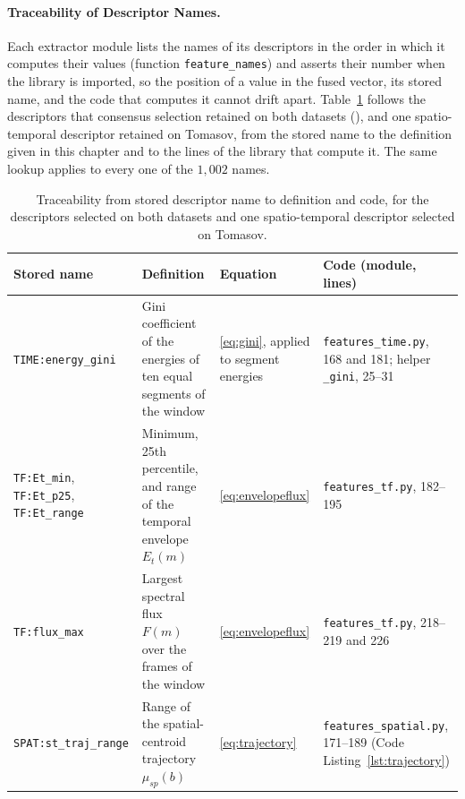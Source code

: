 \paragraph[Traceability of Descriptor Names]{Traceability of Descriptor Names.}
Each extractor module lists the names of its descriptors in the order in which it computes their values (function \texttt{feature\_names}) and asserts their number when the library is imported, so the position of a value in the fused vector, its stored name, and the code that computes it cannot drift apart. Table~\ref{tab:traceability} follows the descriptors that consensus selection retained on both datasets (), and one spatio-temporal descriptor retained on Tomasov, from the stored name to the definition given in this chapter and to the lines of the library that compute it. The same lookup applies to every one of the $1{,}002$ names.

\begin{table}[!htbp]
	\centering
	\caption{Traceability from stored descriptor name to definition and code, for the descriptors selected on both datasets and one spatio-temporal descriptor selected on Tomasov.}
	\label{tab:traceability}
	\footnotesize
	\setlength{\tabcolsep}{4pt}
	\renewcommand{\arraystretch}{1.2}
	\begin{tabularx}{\textwidth}{@{}>{\raggedright\arraybackslash}p{3.7cm} >{\raggedright\arraybackslash}X >{\raggedright\arraybackslash}p{2.0cm} >{\raggedright\arraybackslash}p{4.1cm}@{}}
		\toprule
		\textbf{Stored name} & \textbf{Definition} & \textbf{Equation} & \textbf{Code (module, lines)}\\
		\midrule
		\texttt{TIME:energy\_gini} & Gini coefficient of the energies of ten equal segments of the window & \eqref{eq:gini}, applied to segment energies & \texttt{features\_time.py}, 168 and 181; helper \texttt{\_gini}, 25--31\\
		\addlinespace[3pt]
		\texttt{TF:Et\_min}, \texttt{TF:Et\_p25}, \texttt{TF:Et\_range} & Minimum, 25th percentile, and range of the temporal envelope $E_t(m)$ & \eqref{eq:envelopeflux} & \texttt{features\_tf.py}, 182--195\\
		\addlinespace[3pt]
		\texttt{TF:flux\_max} & Largest spectral flux $F(m)$ over the frames of the window & \eqref{eq:envelopeflux} & \texttt{features\_tf.py}, 218--219 and 226\\
		\addlinespace[3pt]
		\texttt{SPAT:st\_traj\_range} & Range of the spatial-centroid trajectory $\mu_{sp}(b)$ & \eqref{eq:trajectory} & \texttt{features\_spatial.py}, 171--189 (Code Listing~\ref{lst:trajectory})\\
		\bottomrule
	\end{tabularx}
\end{table}

